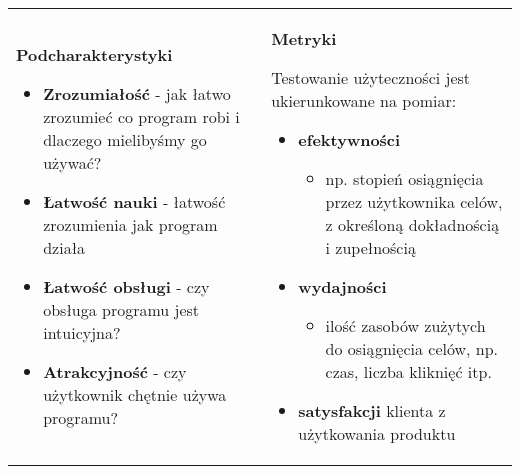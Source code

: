 \documentclass[../main.tex]{subfiles}
\begin{document}
    \begin{table}[H]
        \begin{center}
            \begin{tabular}{p{8cm} p{8cm}}
                \textbf{Podcharakterystyki}
                \begin{itemize}
                    \item \textbf{Zrozumiałość} - jak łatwo zrozumieć co program robi i dlaczego mielibyśmy go używać?
                    \item \textbf{Łatwość nauki} - łatwość zrozumienia jak program działa
                    \item \textbf{Łatwość obsługi} - czy obsługa programu jest intuicyjna?
                    \item \textbf{Atrakcyjność} - czy użytkownik chętnie używa programu?
                \end{itemize}
                &
                \textbf{Metryki}

                Testowanie użyteczności jest ukierunkowane na pomiar:
                \begin{itemize}
                    \item \textbf{efektywności}
                    \begin{itemize}
                        \item np. stopień osiągnięcia przez użytkownika celów, z
                        określoną dokładnością i zupełnością
                    \end{itemize}
                    \item \textbf{wydajności}
                    \begin{itemize}
                        \item ilość zasobów zużytych do osiągnięcia celów, np. czas,
                        liczba kliknięć itp.
                    \end{itemize}
                    \item \textbf{satysfakcji} klienta z użytkowania produktu
                \end{itemize}
            \end{tabular}
        \end{center}
    \end{table}
\end{document}
